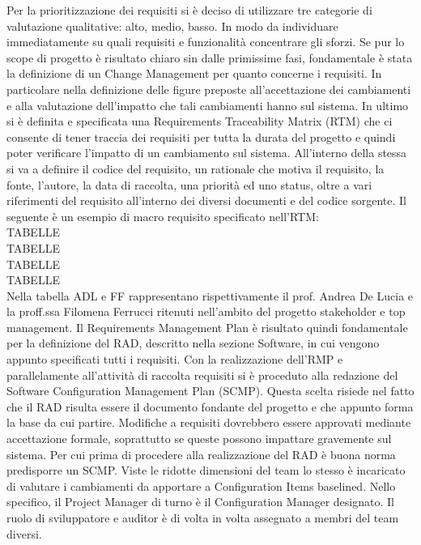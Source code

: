 Per la prioritizzazione dei requisiti si \`{e} deciso di utilizzare tre categorie di valutazione qualitative: alto, medio, basso. In modo da individuare immediatamente su quali requisiti e funzionalit\`{a} concentrare gli sforzi. 
Se pur lo scope di progetto \`{e} risultato chiaro sin dalle primissime fasi, fondamentale \`{e} stata la definizione di un Change Management per quanto concerne i requisiti. In particolare nella definizione delle figure preposte all’accettazione dei cambiamenti e alla valutazione dell’impatto che tali cambiamenti hanno sul sistema.
In ultimo si \`{e} definita e specificata una Requirements Traceability Matrix (RTM) che ci consente di tener traccia dei requisiti per tutta la durata del progetto e quindi poter verificare l\rq impatto di un cambiamento sul sistema. 
All’interno della stessa si va a definire il codice del requisito, un rationale che motiva il requisito, la fonte, l\rq autore, la data di raccolta, una priorità ed uno status, oltre a vari riferimenti del requisito all’interno dei diversi documenti e del codice sorgente.
Il seguente \`{e} un esempio di macro requisito specificato nell’RTM:
\\
TABELLE
\\
TABELLE
\\
TABELLE
\\
TABELLE
\\
Nella tabella ADL e FF rappresentano rispettivamente il prof. Andrea De Lucia e la proff.ssa Filomena Ferrucci ritenuti nell\rq ambito del progetto stakeholder e top management.
Il Requirements Management Plan \`{e} risultato quindi fondamentale per la definizione del RAD, descritto nella sezione Software, in cui vengono appunto specificati tutti i requisiti.
Con la realizzazione dell\rq RMP e parallelamente all’attivit\`{a} di raccolta requisiti si \`{e} proceduto alla redazione del Software Configuration Management Plan (SCMP). Questa scelta risiede nel fatto che il RAD risulta essere il documento fondante del progetto e che appunto forma la base da cui partire. Modifiche a requisiti dovrebbero essere approvati mediante accettazione formale, soprattutto se queste possono impattare gravemente sul sistema.
Per cui prima di procedere alla realizzazione del RAD \`{e} buona norma predisporre un SCMP. 
Viste le ridotte dimensioni del team lo stesso è incaricato di valutare i cambiamenti da apportare a Configuration Items baselined.
Nello specifico, il Project Manager di turno è il Configuration Manager designato. Il ruolo di sviluppatore e auditor è di volta in volta assegnato a membri del team diversi.
